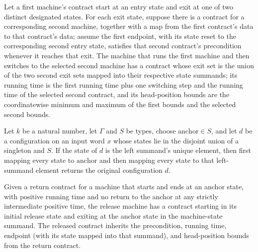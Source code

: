 \begin{definition}
\label{Turing.Contract.branch}
\leanok
{}
Let a first machine's contract start at an entry state and exit at one of two distinct
designated states. For each exit state, suppose there is a contract for a corresponding
second machine, together with a map from the first contract's data to that contract's
data; assume the first endpoint, with its state reset to the corresponding second entry
state, satisfies that second contract's precondition whenever it reaches that exit. The
machine that runs the first machine and then switches to the selected second machine has
a contract whose exit set is the union of the two second exit sets mapped into their
respective state summands; its running time is the first running time plus one switching
step and the running time of the selected second contract, and its head-position bounds
are the coordinatewise minimum and maximum of the first bounds and the selected second
bounds.
\end{definition}

\begin{lemma}
\label{Turing.release_start}
\leanok
{}
Let $k$ be a natural number, let $\Gamma$ and $S$ be types, choose $\mathrm{anchor}\in
S$, and let $d$ be a configuration on an input word $x$ whose states lie in the disjoint
union of a singleton and $S$. If the state of $d$ is the left summand's unique element,
then first mapping every state to $\mathrm{anchor}$ and then mapping every state to that
left-summand element returns the original configuration $d$.
\end{lemma}

\begin{definition}
\label{Turing.ReturnContract.release}
\leanok
{}
Given a return contract for a machine that starts and ends at an anchor state, with
positive running time and no return to the anchor at any strictly intermediate positive
time, the release machine has a contract starting in its initial release state and
exiting at the anchor state in the machine-state summand. The released contract inherits
the precondition, running time, endpoint (with its state mapped into that summand), and
head-position bounds from the return contract.
\end{definition}

